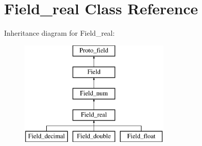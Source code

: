 \hypertarget{classField__real}{}\section{Field\+\_\+real Class Reference}
\label{classField__real}
Inheritance diagram for Field\+\_\+real\+:\begin{figure}[H]
\begin{center}
\leavevmode
\includegraphics[height=5.000000cm]{classField__real}
\end{center}
\end{figure}
